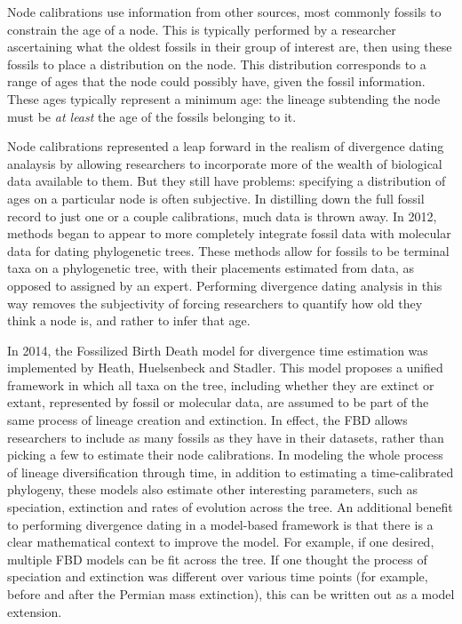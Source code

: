 \documentclass[]{article}
\begin{document}
Node calibrations use information from other sources, most commonly fossils to constrain the age of a node.
This is typically performed by a researcher ascertaining what the oldest fossils in their group of interest are, then using these fossils to place a distribution on the node.
This distribution corresponds to a range of ages that the node could possibly have, given the fossil information.
These ages typically represent a minimum age: the lineage subtending the node must be \textit{at least} the age of the fossils belonging to it. \par
Node calibrations represented a leap forward in the realism of divergence dating analaysis by allowing researchers to incorporate more of the wealth of biological data available to them.
But they still have problems: specifying a distribution of ages on a particular node is often subjective. 
In distilling down the full fossil record to just one or a couple calibrations, much data is thrown away.
In 2012, methods began to appear to more completely integrate fossil data with molecular data for dating phylogenetic trees.
These methods allow for fossils to be terminal taxa on a phylogenetic tree, with their placements estimated from data, as opposed to assigned by an expert.
Performing divergence dating analysis in this way removes the subjectivity of forcing researchers to quantify how old they think a node is, and rather to infer that age. \par
In 2014, the Fossilized Birth Death model for divergence time estimation was implemented by Heath, Huelsenbeck and Stadler.
This model proposes a unified framework in which all taxa on the tree, including whether they are extinct or extant, represented by fossil or molecular data, are assumed to be part of the same process of lineage creation and extinction.
In effect, the FBD allows researchers to include as many fossils as they have in their datasets, rather than picking a few to estimate their node calibrations.
In modeling the whole process of lineage diversification through time, in addition to estimating a time-calibrated phylogeny, these models also estimate other interesting parameters, such as speciation, extinction and rates of evolution across the tree. 
An additional benefit to performing divergence dating in a model-based framework is that there is a clear mathematical context to improve the model.
For example, if one desired, multiple FBD models can be fit across the tree.
If one thought the process of speciation and extinction was different over various time points (for example, before and after the Permian mass extinction), this can be written out as a model extension.
\end{document}
